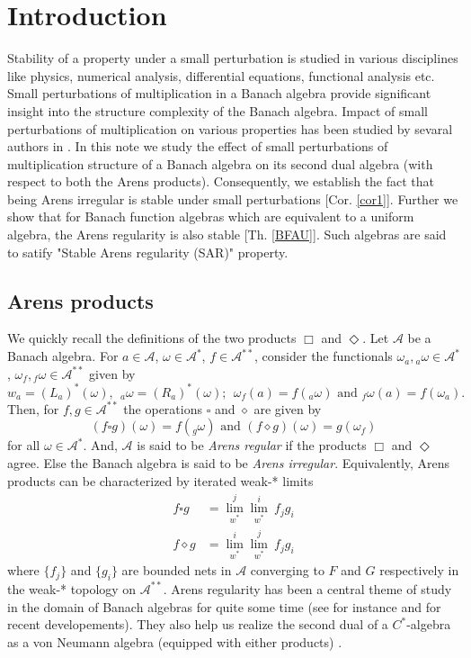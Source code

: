 \documentclass[pdflatex,sn-mathphys-num]{sn-jnl}%
\newcommand{\mA}{\mathcal A}
\theoremstyle{thmstyleone}%
\theoremstyle{thmstyletwo}%
\theoremstyle{thmstylethree}%
\begin{document}
\section{Introduction}
Stability of a property under a small perturbation is studied in various disciplines like physics, numerical analysis, differential equations, functional analysis etc. Small perturbations of multiplication in a Banach algebra provide significant insight into the structure complexity of the Banach algebra. Impact of small perturbations of multiplication on various properties has been studied by sevaral authors in \cite{Dosi, Jarosz1985, Johnsons}. In this note we study the effect of small perturbations of multiplication structure of a Banach algebra on its second dual algebra (with respect to both the Arens products). Consequently, we establish the fact that being Arens irregular is stable under small perturbations [Cor. \ref{cor1}]. Further we show that for Banach function algebras which are equivalent to a uniform algebra, the Arens regularity is also stable [Th. \ref{BFAU}]. Such algebras are said to satify "Stable Arens regularity (SAR)" property.

\subsection{Arens products}
We quickly recall the definitions of the two products $\Box$ and
$\Diamond$.  Let $\mA$ be a Banach algebra. For $a \in \mA$,
$\omega\in \mA^*$, $f\in \mA^{**}$, consider the functionals
$\omega_a, {}_{a}\omega\in \mA^*$, $\omega_f,{}_f\omega\in \mA^{**}$
given by
\[
w_a=(L_a)^*(\omega),~~
{}_a\omega=(R_a)^*(\omega);~~ \omega_f(a)=f({}_a\omega)\text{ and }
{}_f\omega(a)=f(\omega_a).
\]
Then, for $f,g\in \mA^{**}$ the
operations $\square$ and $\diamond$ are given by
\[
(f\square g)
(\omega)= f({}_g\omega)\text{ and } (f\diamond
g)(\omega)=g(\omega_f)
\]
for all $\omega \in \mA^*$. And, $\mA$ is said to be {\em Arens regular} if the
products $\Box$ and $ \Diamond$ agree. Else the Banach algebra is said to be {\em Arens irregular}. Equivalently, Arens products can be characterized by iterated weak-* limits
\begin{align*}
	f\square g&=\overset{j}{\underset{w^*}{\lim }}\overset{i}{\underset{w^*}{\lim}}~ f_j g_i\\
	f\diamond g&=\overset{i}{\underset{w^*}{\lim }}\overset{j}{\underset{w^*}{\lim}}~ f_jg_i
\end{align*}
where $\{f_j\}$ and $\{g_i\}$ are bounded nets  in $\mathcal A$ converging to $F$ and $G$ respectively in the weak-* topology on $\mathcal A^{**}$. Arens regularity has been a central theme of study in the domain of Banach algebras for quite some time (see for instance \cite{Lav0} and \cite{Lav1} for recent developements). They also help us realize the second dual of a $C^*$-algebra as a von Neumann algebra (equipped with either products) \cite{Lav2}.  \\
\end{document}
